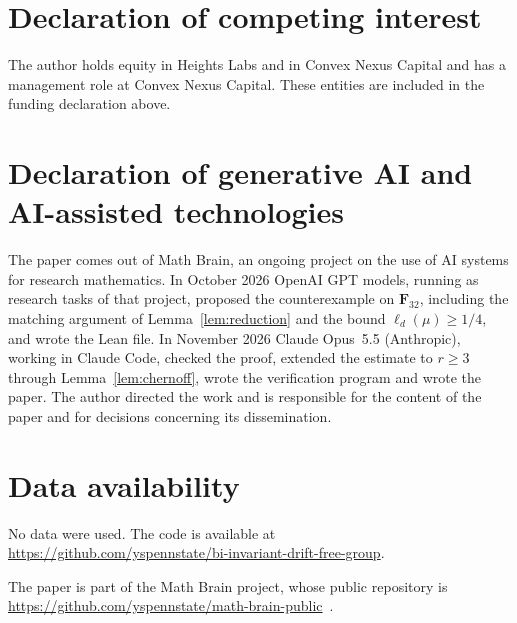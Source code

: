 \documentclass[11pt]{amsart}
\theoremstyle{definition}
\theoremstyle{remark}
\numberwithin{equation}{section}
\newcommand{\F}{\mathbf F}
\begin{document}
\section*{Declaration of competing interest}
The author holds equity in Heights Labs and in Convex Nexus Capital and
has a management role at Convex Nexus Capital. These entities are included
in the funding declaration above.

\section*{Declaration of generative AI and AI-assisted technologies}
The paper comes out of Math Brain, an ongoing project on the use of AI systems for research mathematics. In October 2026 OpenAI GPT models, running as research tasks of that project, proposed the counterexample on $\F_{32}$, including the matching argument of Lemma~\ref{lem:reduction} and the bound $\ell_d(\mu)\ge1/4$, and wrote the Lean file. In November 2026 Claude Opus~5.5 (Anthropic), working in Claude Code, checked the proof, extended the estimate to $r\ge3$ through Lemma~\ref{lem:chernoff}, wrote the verification program and wrote the paper. The author directed the work and is responsible for the content of the paper and for decisions concerning its dissemination.

\section*{Data availability}
No data were used. The code is available at\\ \url{https://github.com/yspennstate/bi-invariant-drift-free-group}.

The paper is part of the Math Brain project, whose public repository is \url{https://github.com/yspennstate/math-brain-public}~\cite{MathBrainRepo}.
\end{document}
